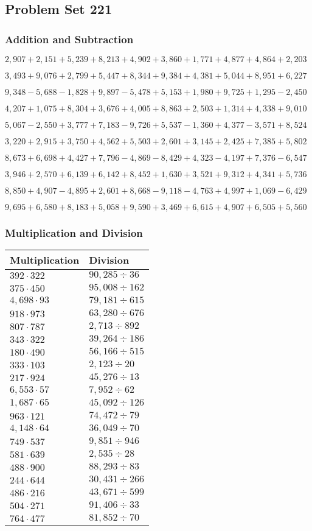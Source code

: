 \hypertarget{problem-set-221}{%
\subsection{Problem Set 221}\label{problem-set-221}}

\hypertarget{addition-and-subtraction}{%
\subsubsection{Addition and
Subtraction}\label{addition-and-subtraction}}

\(2,907+2,151+5,239+8,213+4,902+3,860+1,771+4,877+4,864+2,203\)

\(3,493+9,076+2,799+5,447+8,344+9,384+4,381+5,044+8,951+6,227\)

\(9,348-5,688-1,828+9,897-5,478+5,153+1,980+9,725+1,295-2,450\)

\(4,207+1,075+8,304+3,676+4,005+8,863+2,503+1,314+4,338+9,010\)

\(5,067-2,550+3,777+7,183-9,726+5,537-1,360+4,377-3,571+8,524\)

\(3,220+2,915+3,750+4,562+5,503+2,601+3,145+2,425+7,385+5,802\)

\(8,673+6,698+4,427+7,796-4,869-8,429+4,323-4,197+7,376-6,547\)

\(3,946+2,570+6,139+6,142+8,452+1,630+3,521+9,312+4,341+5,736\)

\(8,850+4,907-4,895+2,601+8,668-9,118-4,763+4,997+1,069-6,429\)

\(9,695+6,580+8,183+5,058+9,590+3,469+6,615+4,907+6,505+5,560\)

\hypertarget{multiplication-and-division}{%
\subsubsection{Multiplication and
Division}\label{multiplication-and-division}}

\begin{longtable}[]{@{}ll@{}}
\toprule
Multiplication & Division\tabularnewline
\midrule
\endhead
\(392\cdot322\) & \(90,285÷36\)\tabularnewline
\(375\cdot450\) & \(95,008÷162\)\tabularnewline
\(4,698\cdot93\) & \(79,181÷615\)\tabularnewline
\(918\cdot973\) & \(63,280÷676\)\tabularnewline
\(807\cdot787\) & \(2,713÷892\)\tabularnewline
\(343\cdot322\) & \(39,264÷186\)\tabularnewline
\(180\cdot490\) & \(56,166÷515\)\tabularnewline
\(333\cdot103\) & \(2,123÷20\)\tabularnewline
\(217\cdot924\) & \(45,276÷13\)\tabularnewline
\(6,553\cdot57\) & \(7,952÷62\)\tabularnewline
\(1,687\cdot65\) & \(45,092÷126\)\tabularnewline
\(963\cdot121\) & \(74,472÷79\)\tabularnewline
\(4,148\cdot64\) & \(36,049÷70\)\tabularnewline
\(749\cdot537\) & \(9,851÷946\)\tabularnewline
\(581\cdot639\) & \(2,535÷28\)\tabularnewline
\(488\cdot900\) & \(88,293÷83\)\tabularnewline
\(244\cdot644\) & \(30,431÷266\)\tabularnewline
\(486\cdot216\) & \(43,671÷599\)\tabularnewline
\(504\cdot271\) & \(91,406÷33\)\tabularnewline
\(764\cdot477\) & \(81,852÷70\)\tabularnewline
\bottomrule
\end{longtable}
